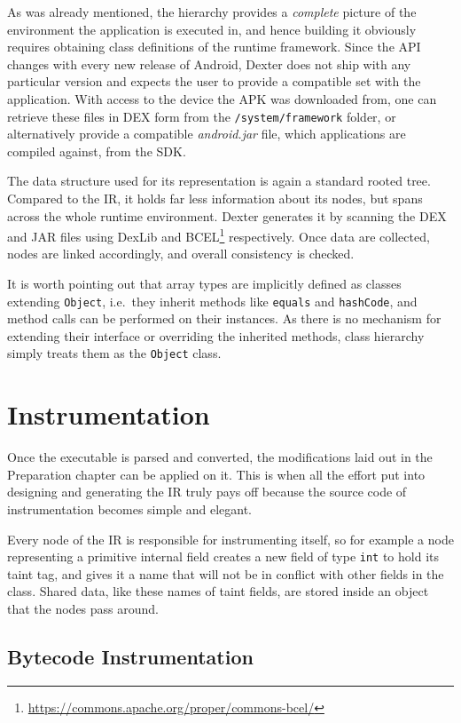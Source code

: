 \documentclass[12pt,twoside,notitlepage]{report}
\newcommand{\weblink}[1] {\footnote{\scriptsize\url{#1}}}
\begin{document}
As was already mentioned, the hierarchy provides a \emph{complete} picture of the environment the application is executed in, and hence building it obviously requires obtaining class definitions of the runtime framework. Since the API changes with every new release of Android, Dexter does not ship with any particular version and expects the user to provide a compatible set with the application. With access to the device the APK was downloaded from, one can retrieve these files in DEX form from the \verb$/system/framework$ folder, or alternatively provide a compatible \emph{android.jar} file, which applications are compiled against, from the SDK. 

The data structure used for its representation is again a standard rooted tree. Compared to the IR, it holds far less information about its nodes, but spans across the whole runtime environment. Dexter generates it by scanning the DEX and JAR files using DexLib and BCEL\weblink{https://commons.apache.org/proper/commons-bcel/} respectively. Once data are collected, nodes are linked accordingly, and overall consistency is checked.

It is worth pointing out that array types are implicitly defined as classes extending \verb$Object$, i.e.\ they inherit methods like \verb$equals$ and \verb$hashCode$, and method calls can be performed on their instances. As there is no mechanism for extending their interface or overriding the inherited methods, class hierarchy simply treats them as the \verb$Object$ class.

\section{Instrumentation}

Once the executable is parsed and converted, the modifications laid out in the Preparation chapter can be applied on it. This is when all the effort put into designing and generating the IR truly pays off because the source code of instrumentation becomes simple and elegant. 

Every node of the IR is responsible for instrumenting itself, so for example a node representing a primitive internal field creates a new field of type \verb$int$ to hold its taint tag, and gives it a name that will not be in conflict with other fields in the class. Shared data, like these names of taint fields, are stored inside an object that the nodes pass around.

\subsection{Bytecode Instrumentation}
\end{document}
